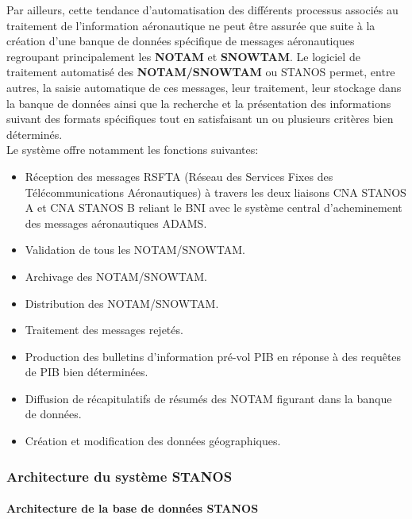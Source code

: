 Par ailleurs, cette tendance d’automatisation des différents processus associés au traitement de l’information aéronautique ne peut être assurée que suite à la création d’une banque de données spécifique de messages aéronautiques regroupant principalement les \textbf{NOTAM} et \textbf{SNOWTAM}. Le logiciel de traitement automatisé des \textbf{NOTAM/SNOWTAM} ou STANOS permet, entre autres, la saisie automatique de ces messages, leur traitement, leur stockage dans la banque de données ainsi que la recherche et la présentation des informations suivant des formats spécifiques tout en satisfaisant un ou plusieurs critères bien déterminés.\\

Le système offre notamment les fonctions suivantes: \\
\begin{itemize}
\item Réception des messages RSFTA (Réseau des Services Fixes des Télécommunications Aéronautiques) à travers les deux liaisons CNA STANOS A et CNA STANOS B reliant le BNI avec le système central d’acheminement des messages aéronautiques ADAMS. \\
\item Validation de tous les NOTAM/SNOWTAM.\\
\item Archivage des NOTAM/SNOWTAM. \\
\item Distribution des NOTAM/SNOWTAM. \\
\item Traitement des messages rejetés. \\
\item Production des bulletins d’information pré-vol PIB en réponse à des requêtes de PIB bien déterminées. \\
\item Diffusion de récapitulatifs de résumés des NOTAM figurant dans la banque de données. \\
\item Création et modification des données géographiques.
\end{itemize}
\subsubsection{Architecture du système STANOS}
\paragraph{Architecture de la base de données STANOS}
~~\\

